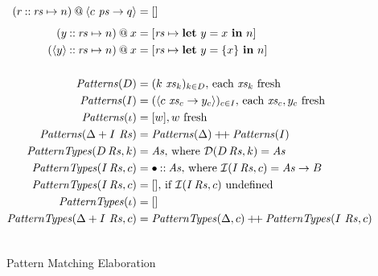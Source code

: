 \documentclass[11pt]{article}
\newcommand{\key}[1]{\textbf{#1}} %
\newcommand{\handleSymbol}{\rightarrow}
\newcommand{\handle}[2]{{#1} \handleSymbol {#2}}
\newcommand{\thunk}[1]{\{{#1}\}}
\newcommand{\effin}[1]{\langle {#1} \rangle}
\newcommand{\id}{\iota}
\begin{document}
\begin{figure*}
\begin{align*}
(r \cons \rs \mapsto n) \proj \effin{\handle{c~\ps}{q}} &= \emptylist \\[1ex]
(y \cons \rs \mapsto n) \proj x &= [\rs \mapsto \key{let}~y = x~\key{in}~n] \\
(\effin{y} \cons \rs \mapsto n) \proj x &=
  [\rs \mapsto \key{let}~y = \thunk{x}~\key{in}~n] \\
\\
\Patterns(D) &= (k~\xs_k)_{k \in D}, \, \text{each }\xs_k \text{ fresh} \\
\Patterns(I) &= (\effin{\handle{c~\xs_c}{y_c}})_{c \in I}, \, \text{each }\xs_c, y_c \text{ fresh} \\
\Patterns(\id) &= [w],  w \text{ fresh} \\
\Patterns(\Delta + I~\Rs) &= \Patterns(\Delta) \concat \Patterns(I) \\
\PatternTypes(D\,\Rs, k) &= \As, \, \text{where }\dcon(D\,\Rs, k) = \As \\
\PatternTypes(I\,\Rs, c) &= \bullet \cons \As, \,   \text{where }\icom(I\,\Rs, c) = \As \to B \\
\PatternTypes(I\,\Rs, c) &= [], \, \text{if }\icom(I\,\Rs, c)\text{ undefined} \\
\PatternTypes(\id) &= \emptylist \\
\PatternTypes(\Delta + I~\Rs, c) &= 
\PatternTypes(\Delta, c) \concat \PatternTypes(I~\Rs, c) \\
\\
\end{align*}
\caption{Pattern Matching Elaboration}
\label{fig:pattern-matching-elaboration}
\end{figure*}
\end{document}
